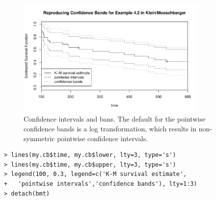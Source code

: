 \documentclass[11pt]{article}
\begin{document}
\begin{figure}[htp]
\centering
\includegraphics[height=2.3in]{../figures/confBand.pdf} \vspace{-4mm}
\caption{Confidence intervals and bans. The default for the pointwise confidence bands is a log transformation, which results in non-symmetric pointwise confidence intervals.}
\end{figure}
\begin{verbatim}
> lines(my.cb$time, my.cb$lower, lty=3, type='s')
> lines(my.cb$time, my.cb$upper, lty=3, type='s')
> legend(100, 0.3, legend=c('K-M survival estimate',
+   'pointwise intervals','confidence bands'), lty=1:3)
> detach(bmt)
\end{verbatim}

\pagebreak

{}
\label{cumulativeHazard}
\end{document}
